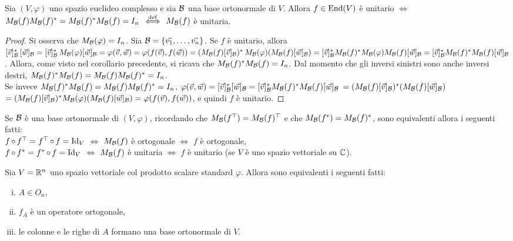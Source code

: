 \begin{proposition}
	Sia $(V, \varphi)$ uno spazio euclideo complesso e sia $\mathcal{B}$ una base ortonormale di $V$. Allora $f \in \operatorname{End}(V)$ è unitario $\iff$ $M_{\mathcal{B}}(f) M_{\mathcal{B}}(f)^* = M_{\mathcal{B}}(f)^* M_{\mathcal{B}}(f) = I_n$ $\overset{\mathrm{def}}{\iff}$ $M_{\mathcal{B}}(f)$ è unitaria.
\end{proposition}

\begin{proof}
	Si osserva che $M_{\mathcal{B}}(\varphi) = I_n$. Sia $\basis = \{ \vv 1, \ldots, \vv n\}$. Se $f$ è unitario, allora
	$[\v]_\basis^* \, [\w]_\basis = [\v]_\basis^* \, M_\basis(\varphi) [\w]_\basis = \varphi(\v, \w) =
	\varphi(f(\v), f(\w)) = (M_\basis(f) [\v]_\basis)^* \, M_\basis(\varphi) (M_\basis(f) [\w]_\basis) =
	[\v]_\basis^* M_\basis(f)^* M_\basis(\varphi) M_\basis(f) [\w]_\basis = [\v]_\basis^* M_\basis(f)^* M_\basis(f) [\w]_\basis$. Allora, come visto nel corollario precedente, si ricava che $M_{\mathcal{B}}(f)^* M_{\mathcal{B}}(f) = I_n$. Dal momento che gli inversi sinistri sono anche inversi destri, $M_{\mathcal{B}}(f)^* M_{\mathcal{B}}(f) = M_{\mathcal{B}}(f) M_{\mathcal{B}}(f)^* = I_n$. \\
	
	Se invece $M_{\mathcal{B}}(f)^* M_{\mathcal{B}}(f) = M_{\mathcal{B}}(f) M_{\mathcal{B}}(f)^* = I_n$, $\varphi(\v, \w) = [\v]_\basis^* [\w]_\basis = [\v]_\basis^* M_\basis(f)^* M_\basis(f) [\w]_\basis$ $=
	(M_\basis(f) [\v]_\basis)^* (M_\basis(f) [\w]_\basis)$ $= (M_\basis(f) [\v]_\basis)^* M_\basis(\varphi) (M_\basis(f) [\w]_\basis) = \varphi(f(\v), f(\w))$, e quindi
	$f$ è unitario.
\end{proof}

\begin{remark}
	Se $\mathcal{B}$ è una base ortonormale di $(V, \varphi)$, ricordando che $M_{\mathcal{B}}(f^\top) = M_{\mathcal{B}}(f)^\top$ e che $M_{\mathcal{B}}(f^*) = M_{\mathcal{B}}(f)^*$, sono equivalenti allora i seguenti fatti: \\
	
	\li $f \circ f^\top = f^\top \circ f = \Idv$ $\iff$ $M_{\mathcal{B}}(f)$ è ortogonale $\iff$ $f$ è ortogonale, \\ 
	\li $f \circ f^* = f^* \circ f = \Idv$ $\iff$ $M_{\mathcal{B}}(f)$ è unitaria $\iff$ $f$ è unitario (se $V$ è uno spazio vettoriale su $\mathbb C$).
\end{remark}

\begin{proposition}
	Sia $V = \mathbb R^n$ uno spazio vettoriale col prodotto scalare standard $\varphi$. Allora sono equivalenti i seguenti fatti:
	
	\begin{enumerate}[(i)]
		\item $A \in O_n$,
		\item $f_A$ è un operatore ortogonale,
		\item le colonne e le righe di $A$ formano una base ortonormale di $V$.
	\end{enumerate}
\end{proposition}

